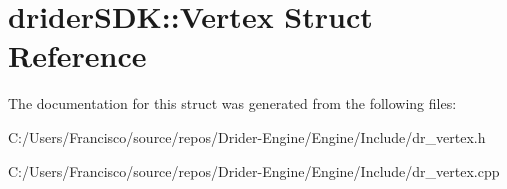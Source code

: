 \hypertarget{structdrider_s_d_k_1_1_vertex}{}\section{drider\+S\+DK\+:\+:Vertex Struct Reference}
\label{structdrider_s_d_k_1_1_vertex}


The documentation for this struct was generated from the following files\+:\begin{DoxyCompactItemize}
\item 
C\+:/\+Users/\+Francisco/source/repos/\+Drider-\/\+Engine/\+Engine/\+Include/dr\+\_\+vertex.\+h\item 
C\+:/\+Users/\+Francisco/source/repos/\+Drider-\/\+Engine/\+Engine/\+Include/dr\+\_\+vertex.\+cpp\end{DoxyCompactItemize}
